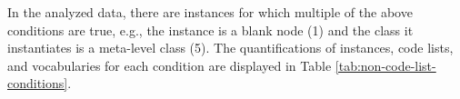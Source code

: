 



In the analyzed data, there are instances for which multiple of the above conditions are true, e.g., the instance is a blank node (1) and the class it instantiates is a meta-level class (5). The quantifications of instances, code lists, and vocabularies for each condition are displayed in Table \ref{tab:non-code-list-conditions}.

